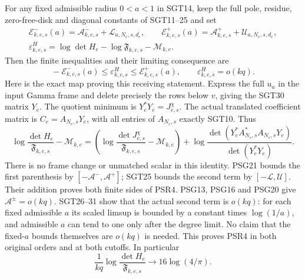 \documentclass[10pt]{article}
\begin{document}
For any fixed admissible radius $0<a<1$ in SGT14, keep the full pole,
residue, zero-free-disk and diagonal constants of SGT11--25 and set
\[
\begin{gathered}
 \mathcal E^-_{k,e,s}(a)=\mathcal A^-_{k,e,s}
                         +\mathcal L_{a,N_e,s,d_e},\qquad
 \mathcal E^+_{k,e,s}(a)=\mathcal A^+_{k,e,s}
                         +\mathcal U_{a,N_e,s,d_e},\\
 \varepsilon^H_{k,e,s}
       =\log\det H_e-\log\mathfrak F_{k,e,s}-\mathcal M_{k,e}.
\end{gathered}\tag{PSR3}
\]
Then the finite inequalities and their limiting consequence are
\[
\boxed{\quad
 -\mathcal E^-_{k,e,s}(a)\le\varepsilon^H_{k,e,s}
                   \le\mathcal E^+_{k,e,s}(a),\qquad
 \varepsilon^H_{k,e,s}=o(kq).
 \quad}\tag{PSR4}
\]
Here is the exact map proving this receiving statement. Express the
full $u_a$ in the input Gamma frame and delete precisely the rows below
$v$, giving the SGT30 matrix $Y_e$. The quotient minimum is
$Y_e^*Y_e=J^\chi_{e,s}$. The actual translated coefficient matrix is
$C_e=A_{N_e,s}Y_e$, with all entries of $A_{N_e,s}$ exactly SGT10.
Thus
\[
 \log\frac{\det H_e}{\mathfrak F_{k,e,s}}-\mathcal M_{k,e}
 =\left(\log\frac{\det J^\chi_{e,s}}{\mathfrak F_{k,e,s}}
                        -\mathcal M_{k,e}\right)
   +\log\frac{\det(Y_e^*A_{N_e,s}^*A_{N_e,s}Y_e)}
                   {\det(Y_e^*Y_e)} .\tag{PSR5}
\]
There is no frame change or unmatched scalar in this identity.
PSG21 bounds the first parenthesis by $[-\mathcal A^-,\mathcal A^+]$;
SGT25 bounds the second term by $[-\mathcal L,\mathcal U]$.
Their addition proves both finite sides of PSR4.
PSG13, PSG16 and PSG20 give $\mathcal A^\pm=o(kq)$.
SGT26--31 show that the actual second term is $o(kq)$: for each
fixed admissible $a$ its scaled limsup is bounded by a constant times
$\log(1/a)$, and admissible $a$ can tend to one only after the degree
limit. No claim that the fixed-$a$ bounds themselves are $o(kq)$ is
needed. This proves PSR4 in both original orders and at both cutoffs.
In particular
\[
 \frac1{kq}\log\frac{\det H_e}{\mathfrak F_{k,e,s}}
      \longrightarrow16\log(4/\pi).\tag{PSR6}
\]
\end{document}
